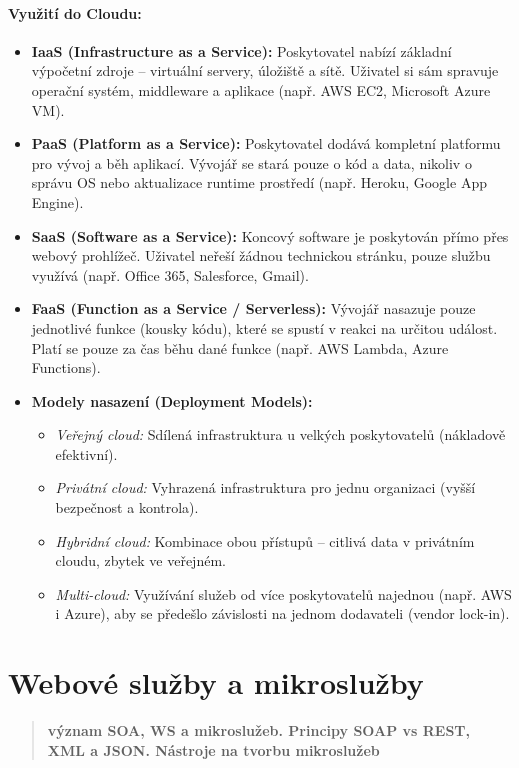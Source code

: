 \paragraph*{Využití do Cloudu:}
\begin{itemize}
    \item \textbf{IaaS (Infrastructure as a Service):} Poskytovatel nabízí základní výpočetní zdroje – virtuální servery, úložiště a sítě. Uživatel si sám spravuje operační systém, middleware a aplikace (např. AWS EC2, Microsoft Azure VM).
    
    \item \textbf{PaaS (Platform as a Service):} Poskytovatel dodává kompletní platformu pro vývoj a běh aplikací. Vývojář se stará pouze o kód a data, nikoliv o správu OS nebo aktualizace runtime prostředí (např. Heroku, Google App Engine).

    \item \textbf{SaaS (Software as a Service):} Koncový software je poskytován přímo přes webový prohlížeč. Uživatel neřeší žádnou technickou stránku, pouze službu využívá (např. Office 365, Salesforce, Gmail).

    \item \textbf{FaaS (Function as a Service / Serverless):} Vývojář nasazuje pouze jednotlivé funkce (kousky kódu), které se spustí v reakci na určitou událost. Platí se pouze za čas běhu dané funkce (např. AWS Lambda, Azure Functions).

    \item \textbf{Modely nasazení (Deployment Models):}
    \begin{itemize}
        \item \textit{Veřejný cloud:} Sdílená infrastruktura u velkých poskytovatelů (nákladově efektivní).
        \item \textit{Privátní cloud:} Vyhrazená infrastruktura pro jednu organizaci (vyšší bezpečnost a kontrola).
        \item \textit{Hybridní cloud:} Kombinace obou přístupů – citlivá data v privátním cloudu, zbytek ve veřejném.
        \item \textit{Multi-cloud:} Využívání služeb od více poskytovatelů najednou (např. AWS i Azure), aby se předešlo závislosti na jednom dodavateli (vendor lock-in).
    \end{itemize}
\end{itemize}

\section{Webové služby a mikroslužby}
\begin{quote}
    \textbf{význam SOA, WS a mikroslužeb. Principy SOAP vs REST, XML a JSON. Nástroje na tvorbu mikroslužeb}
\end{quote}

